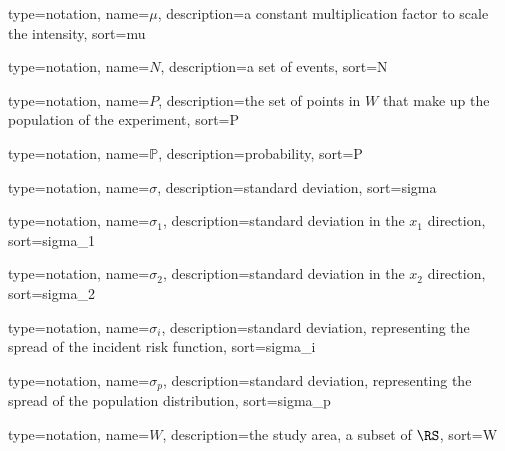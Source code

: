 {%
   type=notation,
   name={\ensuremath{\mu}},
   description={a constant multiplication factor to scale the intensity},
   sort={mu}
}

{%
   type=notation,
   name={\ensuremath{N}},
   description={a set of events},
   sort={N}
}

{%
   type=notation,
   name={\ensuremath{P}},
   description={the set of points in \ensuremath{W} that make up the population of the experiment},
   sort={P}
}

{%
   type=notation,
   name={\ensuremath{\mathbb{P}}},
   description={probability},
   sort={P}
}

{%
   type=notation,
   name={\ensuremath{\sigma}},
   description={standard deviation},
   sort={sigma}
}

{%
   type=notation,
   name={\ensuremath{\sigma_1}},
   description={standard deviation in the \ensuremath{x_1} direction},
   sort={sigma_1}
}

{%
   type=notation,
   name={\ensuremath{\sigma_2}},
   description={standard deviation in the \ensuremath{x_2} direction},
   sort={sigma_2}
}

{%
   type=notation,
   name={\ensuremath{\sigma_i}},
   description={standard deviation, representing the spread of the incident risk function},
   sort={sigma_i}
}

{%
   type=notation,
   name={\ensuremath{\sigma_p}},
   description={standard deviation, representing the spread of the population distribution},
   sort={sigma_p}
}

{%
   type=notation,
   name={\ensuremath{W}},
   description={the study area, a subset of \ensuremath{\RS}},
   sort={W}
}

